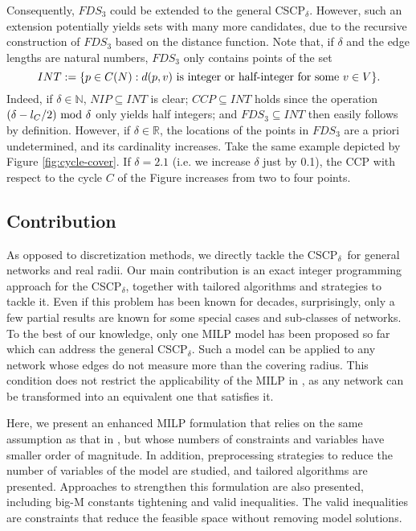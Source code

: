 \documentclass[review]{elsarticle}
\newcommand{\dlt}{{\delta}}
\newcommand{\problem}{CSCP$_\dlt$}
\theoremstyle{definition}
\begin{document}
Consequently, $FDS_3$  could be extended to the general \problem. However, such an extension potentially yields sets with many more candidates, due to the recursive construction of $FDS_3$ based on the distance function. Note that, if $\dlt$ and the edge lengths are natural numbers, $FDS_3$ only contains points of the set
$$INT:=\{p\in C(N): d(p,v)\textup{ is integer or half-integer for some } v\in V\}.$$
Indeed, if $\dlt\in \mathbb{N}$, $NIP\subseteq INT$ is clear; $CCP\subseteq INT$ holds since the operation $(\dlt-{l_C}/{2})\textup{ mod } \dlt$ only yields half integers; and $FDS_3\subseteq INT$ then easily follows by definition. However, if $\dlt\in \mathbb{R}$, the locations of the points in $FDS_3$ are a priori undetermined, and its cardinality increases. Take the same example depicted by Figure \ref{fig:cycle-cover}. If $\dlt=2.1$ (i.e. we increase $\dlt$ just by 0.1), the CCP with respect to the cycle $C$ of the Figure increases from two to four points.


\subsection{Contribution}
As opposed to discretization methods, we directly tackle the \problem\ for general networks and real radii.
Our main contribution is an exact integer programming approach for the \problem, together with tailored algorithms and strategies to tackle it. Even if this problem has been known for decades, surprisingly, only a few partial results are known for some special cases and sub-classes of networks. To the best of our knowledge, only one MILP model \cite{Hamacher20} has been proposed so far which can address the general \problem. Such a model can be applied to any network whose edges do not measure more than the covering radius. This condition does not restrict the applicability of the MILP in \cite{Hamacher20}, as any network can be transformed into an equivalent one that satisfies it.

Here, we present an enhanced MILP formulation that relies on the same assumption as that in \cite{Hamacher20}, but whose numbers of constraints and variables have smaller order of magnitude. In addition, preprocessing strategies to reduce the number of variables of the model are studied, and tailored algorithms are presented. Approaches to strengthen this formulation are also presented, including big-M constants tightening and valid inequalities. The valid inequalities are constraints that reduce the feasible space without removing model solutions.
\end{document}
